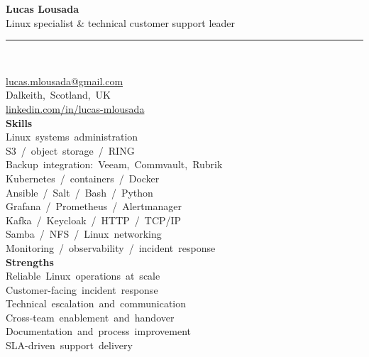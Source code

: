 \documentclass[9pt,a4paper]{article}
\begin{document}
{\color{accent}\LARGE\bfseries Lucas Lousada}\\[0.25em]
{\large Linux specialist \& technical customer support leader}\\[0.75em]
\noindent\rule{\linewidth}{0.5pt}\\[0.7em]
\begin{minipage}[t]{0.33\textwidth}
  \mbox{\href{mailto:lucas.mlousada@gmail.com}{lucas.mlousada@gmail.com}}\\
  \mbox{Dalkeith, Scotland, UK}\\
  \mbox{\href{https://www.linkedin.com/in/lucas-mlousada/}{linkedin.com/in/lucas-mlousada}}\\[0.75em]
  \textbf{Skills}\\
  \mbox{Linux systems administration}\\
  \mbox{S3 / object storage / RING}\\
  \mbox{Backup integration: Veeam, Commvault, Rubrik}\\
  \mbox{Kubernetes / containers / Docker}\\
  \mbox{Ansible / Salt / Bash / Python}\\
  \mbox{Grafana / Prometheus / Alertmanager}\\
  \mbox{Kafka / Keycloak / HTTP / TCP/IP}\\
  \mbox{Samba / NFS / Linux networking}\\
  \mbox{Monitoring / observability / incident response}\\[0.75em]
  \textbf{Strengths}\\
  \mbox{Reliable Linux operations at scale}\\
  \mbox{Customer-facing incident response}\\
  \mbox{Technical escalation and communication}\\
  \mbox{Cross-team enablement and handover}\\
  \mbox{Documentation and process improvement}\\
  \mbox{SLA-driven support delivery}\\
\end{minipage}
\hfill
\end{document}
